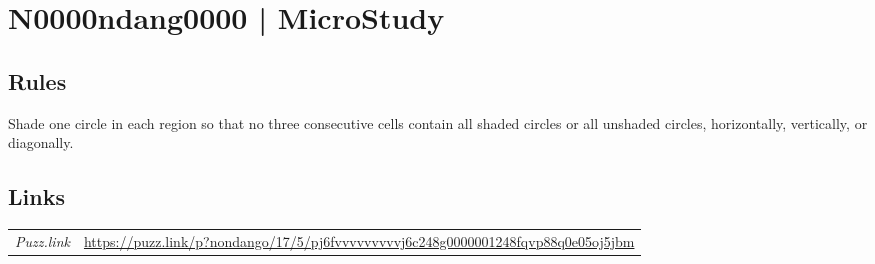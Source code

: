 \section{N0000ndang0000 | {\normalfont MicroStudy}}
\label{sec:32-n0000ndang0000-microstudy}

\subsection*{Rules}
\begin{markdown}
Shade one circle in each region so that no three consecutive cells contain all shaded circles or all unshaded circles, horizontally, vertically, or diagonally.
\end{markdown}
\subsection*{Links}
\begin{tabularx}{\textwidth}{l X}
\emph{Puzz.link} & \url{https://puzz.link/p?nondango/17/5/pj6fvvvvvvvvvj6c248g0000001248fqvp88q0e05oj5jbm} \\
\end{tabularx}
\pagebreak
